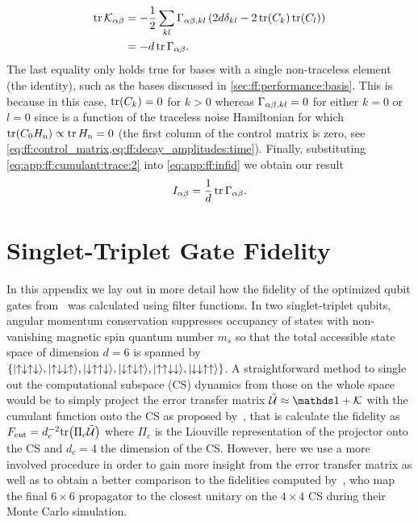 \begin{equation}\label{eq:app:ff:cumulant:trace:2}
    \begin{split}
        \tr\mathcal{K}_{\alpha\beta} &= -\frac{1}{2}\sum_{kl}\Gamma_{\alpha\beta,kl}\left(2d\delta_{kl} - 2\tr(C_k)\tr(C_l)\right) \\
                                      &= -d\tr\Gamma_{\alpha\beta}.
    \end{split}
\end{equation}
The last equality only holds true for bases with a single non-traceless element (the identity), such as the bases discussed in \cref{sec:ff:performance:basis}.
This is because in this case, $\tr(C_k) = 0$ for $k > 0$ whereas $\Gamma_{\alpha\beta,kl} = 0$ for either $k = 0$ or $l = 0$ since \decayamps is a function of the traceless noise Hamiltonian for which $\tr(C_0H_{\mathrm{n}}) \propto \tr H_{\mathrm{n}} = 0$ (\ie the first column of the control matrix is zero, see \cref{eq:ff:control_matrix,eq:ff:decay_amplitudes:time}).
Finally, substituting \cref{eq:app:ff:cumulant:trace:2} into \cref{eq:app:ff:infid} we obtain our result
\begin{equation}
    I_{\alpha\beta} = \frac{1}{d}\tr\Gamma_{\alpha\beta}.
\end{equation}
\section{Singlet-Triplet Gate Fidelity}\label{sec:app:ff:singlet-triplet}
In this appendix we lay out in more detail how the fidelity of the optimized \sts qubit gates from~ was calculated using filter functions.
In two singlet-triplet qubits, angular momentum conservation suppresses occupancy of states with non-vanishing magnetic spin quantum number $m_s$ so that the total accessible state space of dimension $d=6$ is spanned by $\lbrace\mbox{\ensuremath{\ket{\uparrow\downarrow\uparrow\downarrow}}},\mbox{\ensuremath{\ket{\uparrow\downarrow\downarrow\uparrow}}},\mbox{\ensuremath{\ket{\downarrow\uparrow\uparrow\downarrow}}},\mbox{\ensuremath{\ket{\downarrow\uparrow\downarrow\uparrow}}},\mbox{\ensuremath{\ket{\uparrow\uparrow\downarrow\downarrow}}},\mbox{\ensuremath{\ket{\downarrow\downarrow\uparrow\uparrow}}}\rbrace$.
A straightforward method to single out the computational subspace (CS) dynamics from those on the whole space would be to simply project the error transfer matrix $\liouvUe\approx\eye + \cumulantfun$ with \cumulantfun the cumulant function onto the CS as proposed by~\citet{Wood2018}, that is calculate the fidelity as $F_{\mathrm{ent}} = d_c^{-2}\mathrm{tr}\bigl(\Pi_c\mathcal{\tilde{U}}\bigr)$ where $\Pi_c$ is the Liouville representation of the projector onto the CS and $d_c = 4$ the dimension of the CS.
However, here we use a more involved procedure in order to gain more insight from the error transfer matrix as well as to obtain a better comparison to the fidelities computed by~\citet{Cerfontaine2020}, who map the final $6\times 6$ propagator to the closest unitary on the $4\times 4$ CS during their Monte Carlo simulation.

